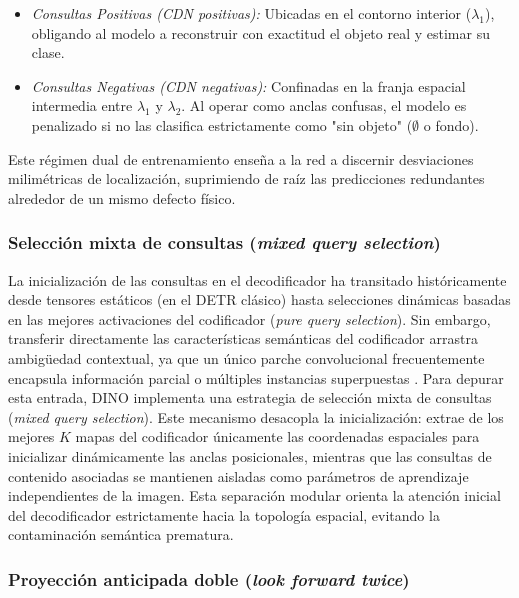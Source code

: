 \begin{itemize}
    \item \textit{Consultas Positivas (CDN positivas):} Ubicadas en el contorno interior ($\lambda_1$), obligando al modelo a reconstruir con exactitud el objeto real y estimar su clase.
    \item \textit{Consultas Negativas (CDN negativas):} Confinadas en la franja espacial intermedia entre $\lambda_1$ y $\lambda_2$. Al operar como anclas confusas, el modelo es penalizado si no las clasifica estrictamente como "sin objeto" ($\emptyset$ o fondo).
\end{itemize}

Este régimen dual de entrenamiento enseña a la red a discernir desviaciones milimétricas de localización, suprimiendo de raíz las predicciones redundantes alrededor de un mismo defecto físico.\\

\subsubsection{Selección mixta de consultas (\textit{mixed query selection})}

La inicialización de las consultas en el decodificador ha transitado históricamente desde tensores estáticos (en el DETR clásico) hasta selecciones dinámicas basadas en las mejores activaciones del codificador (\textit{pure query selection}). Sin embargo, transferir directamente las características semánticas del codificador arrastra ambigüedad contextual, ya que un único parche convolucional frecuentemente encapsula información parcial o múltiples instancias superpuestas \cite{zhang2022dino}. Para depurar esta entrada, DINO implementa una estrategia de selección mixta de consultas (\textit{mixed query selection}). Este mecanismo desacopla la inicialización: extrae de los mejores $K$ mapas del codificador únicamente las coordenadas espaciales para inicializar dinámicamente las anclas posicionales, mientras que las consultas de contenido asociadas se mantienen aisladas como parámetros de aprendizaje independientes de la imagen. Esta separación modular orienta la atención inicial del decodificador estrictamente hacia la topología espacial, evitando la contaminación semántica prematura.\\

\subsubsection{Proyección anticipada doble (\textit{look forward twice})}

